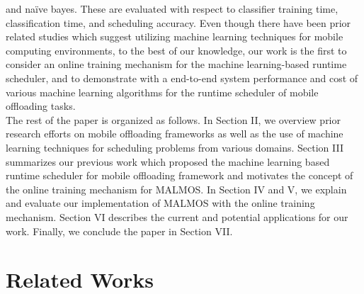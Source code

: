 \documentclass[10pt, conference, compsocconf]{IEEEtran}
\begin{document}
and na\"{i}ve bayes.
%
These are evaluated with respect to classifier training time,
classification time, and scheduling accuracy.
%
Even though there have been prior related studies which suggest
utilizing machine learning techniques for mobile computing environments,
to the best of our knowledge, our work is the first to consider an
online training mechanism for the machine learning-based runtime
scheduler, and to demonstrate with a end-to-end system performance and
cost of various machine learning algorithms for the runtime scheduler of
mobile offloading tasks.\\
%
\indent The rest of the paper is organized as follows.
%
In Section II, we overview prior research efforts on 
mobile offloading frameworks as well as the use of machine
learning techniques for scheduling problems from various domains.
%
Section III summarizes our previous work which proposed the machine
learning based runtime scheduler for mobile offloading framework and
motivates the concept of the online training mechanism for MALMOS. 
%
In Section IV and V, we explain and evaluate our implementation of
MALMOS with the online training mechanism.
%
Section VI describes the current and potential applications for
our work.
%
Finally, we conclude the paper in Section VII.
%
\section{Related Works}
%
\end{document}
